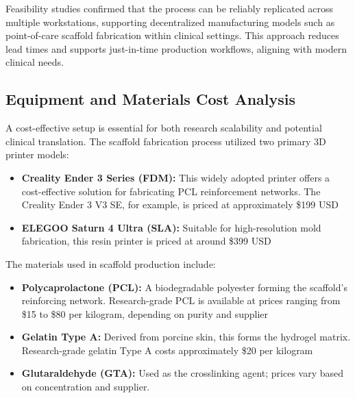 Feasibility studies confirmed that the process can be reliably replicated across multiple workstations, supporting decentralized manufacturing models such as point-of-care scaffold fabrication within clinical settings. This approach reduces lead times and supports just-in-time production workflows, aligning with modern clinical needs.

\subsection{Equipment and Materials Cost Analysis}

A cost-effective setup is essential for both research scalability and potential clinical translation. The scaffold fabrication process utilized two primary 3D printer models:

\begin{itemize}
    \item \textbf{Creality Ender 3 Series (FDM):} This widely adopted printer offers a cost-effective solution for fabricating PCL reinforcement networks. The Creality Ender 3 V3 SE, for example, is priced at approximately \$199 USD \cite{creality_ender3}
    
    \item \textbf{ELEGOO Saturn 4 Ultra (SLA):} Suitable for high-resolution mold fabrication, this resin printer is priced at around \$399 USD \cite{elegoo_saturn4}
\end{itemize}

The materials used in scaffold production include:

\begin{itemize}
    \item \textbf{Polycaprolactone (PCL):} A biodegradable polyester forming the scaffold's reinforcing network. Research-grade PCL is available at prices ranging from \$15 to \$80 per kilogram, depending on purity and supplier \cite{pcl_price}
    
    \item \textbf{Gelatin Type A:} Derived from porcine skin, this forms the hydrogel matrix. Research-grade gelatin Type A costs approximately \$20 per kilogram \cite{gelatin_price}
    
    \item \textbf{Glutaraldehyde (GTA):} Used as the crosslinking agent; prices vary based on concentration and supplier.
\end{itemize}

